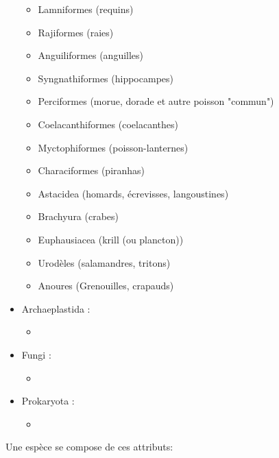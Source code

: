 \begin{itemize}
\begin{itemize}
				\item Lamniformes (requins)
				\item Rajiformes (raies)
				\item Anguiliformes (anguilles)
				\item Syngnathiformes (hippocampes)
				\item Perciformes (morue, dorade et autre poisson "commun")
				\item Coelacanthiformes (coelacanthes)
				\item Myctophiformes (poisson-lanternes)
				\item Characiformes (piranhas)
				
				\item Astacidea (homards, écrevisses, langoustines)
				\item Brachyura (crabes)
				\item Euphausiacea (krill (ou plancton))
				
				\item Urodèles (salamandres, tritons)
				\item Anoures (Grenouilles, crapauds)
			\end{itemize}
	\item Archaeplastida :\begin{itemize}
				\item 
			\end{itemize}
	\item Fungi :\begin{itemize}
				\item 
			\end{itemize}
	\item Prokaryota :\begin{itemize}
				\item 
			\end{itemize}
\end{itemize}
Une espèce se compose de ces attributs:

